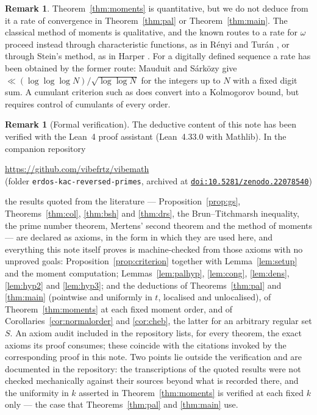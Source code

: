 \documentclass[11pt,a4paper]{article}
\theoremstyle{plain}
\theoremstyle{definition}
\newtheorem{remark}[theorem]{Remark}
\numberwithin{equation}{section}
\begin{document}
\begin{remark}\label{rem:rate}
Theorem~\ref{thm:moments} is quantitative, but we do not deduce from it a rate of convergence in
Theorem~\ref{thm:pal} or Theorem~\ref{thm:main}. The classical method of moments \cite[Thm.~30.2]{Bil} is
qualitative, and the known routes to a rate for $\omega$ proceed instead through characteristic functions,
as in R\'enyi and Tur\'an \cite{RT}, or through Stein's method, as in Harper \cite{Har}. For a digitally
defined sequence a rate has been obtained by the former route: Mauduit and S\'ark\"ozy
\cite[Thm.~4]{MS2} give $\ll(\log\log\log N)/\sqrt{\log\log N}$ for the integers up to $N$ with a fixed
digit sum. A cumulant
criterion such as \cite[Thm.~2.4]{DJS} does convert into a Kolmogorov bound, but requires control of
cumulants of every order.
\end{remark}

\begin{remark}[Formal verification]\label{rem:lean}
The deductive content of this note has been verified with the Lean~4 proof
assistant (Lean~4.33.0 with Mathlib). In the companion repository
\begin{center}
  \url{https://github.com/vibefrtz/vibemath}\\[2pt]
  (folder \texttt{erdos-kac-reversed-primes}, archived at
  \href{https://doi.org/10.5281/zenodo.22078540}{\texttt{doi:10.5281/zenodo.22078540}})
\end{center}
the results quoted from the literature --- Proposition~\ref{prop:gs},
Theorems~\ref{thm:col}, \ref{thm:bsh} and \ref{thm:drs}, the
Brun--Titchmarsh inequality, the prime number theorem, Mertens' second
theorem and the method of moments --- are declared as axioms, in the form in
which they are used here, and everything this note itself proves is
machine-checked from those axioms with no unproved goals:
Proposition~\ref{prop:criterion} together with Lemma~\ref{lem:setup} and the
moment computation; Lemmas~\ref{lem:palhyp}, \ref{lem:cong}, \ref{lem:dens},
\ref{lem:hyp2} and \ref{lem:hyp3}; and the deductions of
Theorems~\ref{thm:pal} and \ref{thm:main} (pointwise and uniformly in $t$,
localised and unlocalised), of Theorem~\ref{thm:moments} at each fixed
moment order, and of Corollaries~\ref{cor:normalorder} and \ref{cor:cheb},
the latter for an arbitrary regular set $S$. An axiom audit included in the
repository lists, for every theorem, the exact axioms its proof consumes;
these coincide with the citations invoked by the corresponding proof in this
note. Two points lie outside the verification and are documented in the
repository: the transcriptions of the quoted results were not checked
mechanically against their sources beyond what is recorded there, and the
uniformity in $k$ asserted in Theorem~\ref{thm:moments} is verified at each
fixed $k$ only --- the case that Theorems~\ref{thm:pal} and \ref{thm:main}
use.
\end{remark}
\end{document}

